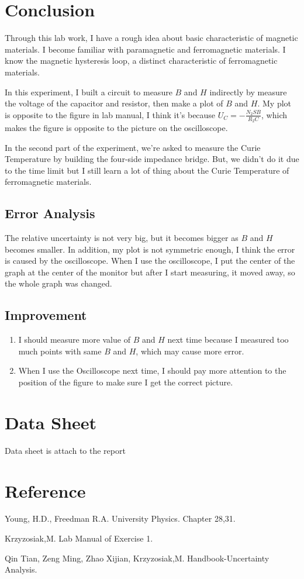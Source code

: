 \documentclass[12pt]{article}
\begin{document}
\section{Conclusion}
\par Through this lab work, I have a rough idea about basic characteristic of magnetic materials. I become familiar with paramagnetic and ferromagnetic materials. I know the magnetic hysteresis loop, a distinct characteristic of ferromagnetic materials.
\par In this experiment, I built a circuit to measure $B$ and $H$ indirectly by measure the voltage of the capacitor and resistor, then make a plot of $B$ and $H$.
 My plot is opposite to the figure in lab manual, I think it's because $U_C=-\frac{N_2 SB}{R_2C}$, which makes the figure is opposite to the picture on the oscilloscope.
\par In the second part of the experiment, we're asked to measure the Curie Temperature by building the four-side impedance bridge. But, we didn't do it due to the time limit but I still learn a lot of thing about the Curie Temperature of ferromagnetic materials.
\subsection{Error Analysis}
The relative uncertainty is not very big, but it becomes bigger as $B$ and $H$ becomes smaller. In addition, my plot is not symmetric enough, I think the error is caused by the oscilloscope. When I use the oscilloscope, I put the center of the graph at the center of the monitor but after I start measuring, it moved away, so the whole graph was changed. 
\subsection{Improvement}
\begin{enumerate}
\item I should measure more value of $B$ and $H$ next time because I measured too much points with same $B$ and $H$, which may cause more error.
\item When I use the Oscilloscope next time, I should pay more attention to the position of the figure to make sure I get the correct picture.
\end{enumerate}
\section{Data Sheet}
Data sheet is attach to the report
\section{Reference}
\par Young, H.D., Freedman R.A. University Physics. Chapter 28,31.
\par Krzyzosiak,M. Lab Manual of Exercise 1.
\par Qin Tian, Zeng Ming, Zhao Xijian, Krzyzosiak,M. Handbook-Uncertainty Analysis.
\end{document}

